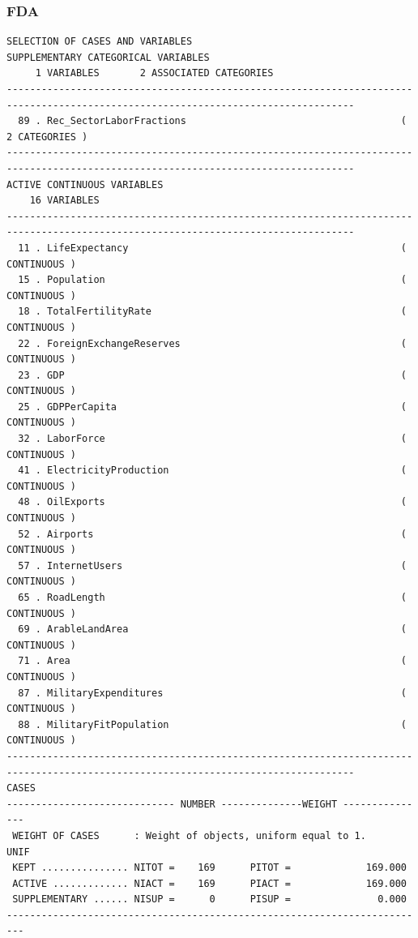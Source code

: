 \documentclass[a4paper,10pt,twocolumn]{article}
\begin{document}
\begin{landscape}
\subsubsection{FDA}\label{fda}
\begin{verbatim}
SELECTION OF CASES AND VARIABLES
SUPPLEMENTARY CATEGORICAL VARIABLES
     1 VARIABLES       2 ASSOCIATED CATEGORIES
----------------------------------------------------------------------------------------------------------------------------------
  89 . Rec_SectorLaborFractions                                     (   2 CATEGORIES )
----------------------------------------------------------------------------------------------------------------------------------
ACTIVE CONTINUOUS VARIABLES
    16 VARIABLES
----------------------------------------------------------------------------------------------------------------------------------
  11 . LifeExpectancy                                               ( CONTINUOUS )
  15 . Population                                                   ( CONTINUOUS )
  18 . TotalFertilityRate                                           ( CONTINUOUS )
  22 . ForeignExchangeReserves                                      ( CONTINUOUS )
  23 . GDP                                                          ( CONTINUOUS )
  25 . GDPPerCapita                                                 ( CONTINUOUS )
  32 . LaborForce                                                   ( CONTINUOUS )
  41 . ElectricityProduction                                        ( CONTINUOUS )
  48 . OilExports                                                   ( CONTINUOUS )
  52 . Airports                                                     ( CONTINUOUS )
  57 . InternetUsers                                                ( CONTINUOUS )
  65 . RoadLength                                                   ( CONTINUOUS )
  69 . ArableLandArea                                               ( CONTINUOUS )
  71 . Area                                                         ( CONTINUOUS )
  87 . MilitaryExpenditures                                         ( CONTINUOUS )
  88 . MilitaryFitPopulation                                        ( CONTINUOUS )
----------------------------------------------------------------------------------------------------------------------------------
CASES
----------------------------- NUMBER --------------WEIGHT ---------------
 WEIGHT OF CASES      : Weight of objects, uniform equal to 1.                  UNIF
 KEPT ............... NITOT =    169      PITOT =             169.000
 ACTIVE ............. NIACT =    169      PIACT =             169.000
 SUPPLEMENTARY ...... NISUP =      0      PISUP =               0.000
-------------------------------------------------------------------------


\end{verbatim}
\end{landscape}
\end{document}
